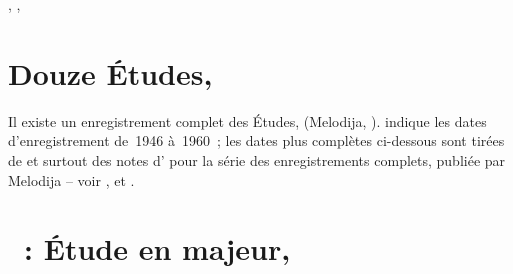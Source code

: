\begin{workitemize}
\begin{perfitemize}
{  ,
  ,
  }
 \end{perfitemize}
 \item{}
 \begin{perfitemize}
  \item{}
 \end{perfitemize}
 \item{}
 \begin{perfitemize}
  \item{}
 \end{perfitemize}
\end{workitemize}

\section*{%
Douze Études, }

Il existe un enregistrement complet des Études,  (Melodija,
).
\FMalik{} \citep[voir][p.~72]{Malik} indique les dates d'enregistrement
de~1946 à~1960~; les dates plus complètes ci-dessous sont tirées de
\citet{Masuda} et surtout des notes d'\INikonovich{} pour la série des
enregistrements complets, publiée par Melodija -- voir
\citet[vol.~10]{Nikonovich79}, \citet[p.~8]{Nikonovich11} et
\citet[p.~382]{Scriabine}.

\section{\ifChrono \Scriabine{}~: \fi
Étude en \kC \Sharp majeur,  }
\label{\thesection}

